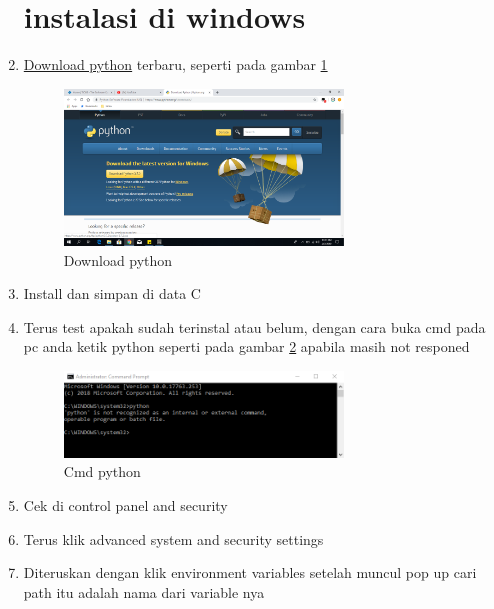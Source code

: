 \begin{enumerate}
	
\section{instalasi di windows}
	
\item   \href{https://www.python.org/downloads/}{Download python} terbaru, seperti pada gambar \ref{Download}
\begin{figure}[ht]
	\centerline{\includegraphics[width=0.70\textwidth]{figures/download_python.PNG}}
	\caption{Download python}
	\label{Download}
\end{figure}
	
\item	Install dan simpan di data C
	
\item	Terus test apakah sudah terinstal atau belum, dengan cara buka cmd pada pc anda ketik python seperti pada gambar \ref{cmd_python} apabila masih not responed
\begin{figure}[ht]
	\centerline{\includegraphics[width=0.70\textwidth]{figures/cmd_python.PNG}}
	\caption{Cmd python}
	\label{cmd_python}
\end{figure}
	
\item	Cek di control panel and security
	
\item	Terus klik advanced system and security settings
	
\item	Diteruskan dengan klik environment variables setelah muncul pop up cari path itu adalah nama dari variable nya
	

\end{enumerate}
